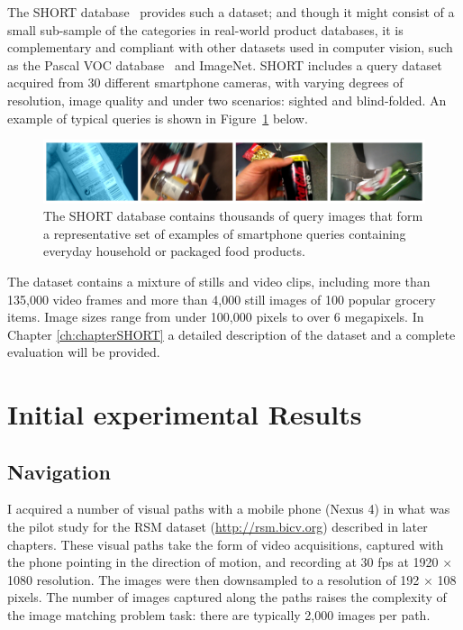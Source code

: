 The SHORT database~\cite{Rivera-Rubio2013a} provides such a dataset; and though it might consist of a small sub-sample of the categories in real-world product databases, it is  complementary and compliant with other datasets used in computer vision, such as the Pascal VOC database~\cite{Everingham2009} and ImageNet.  SHORT includes a query dataset acquired from 30 different smartphone cameras, with varying degrees of resolution, image quality and under two scenarios: sighted and blind-folded.  An example of typical queries is shown in Figure~\ref{fig:ShortQueries} below.

\begin{figure}
\centering
\includegraphics[width=\textwidth]{./gfx/Chapter02/TestDatasetCollage4imgs.jpg}
\caption{The SHORT database contains thousands of query images that form a representative set of examples of smartphone queries containing everyday household or packaged food products.}
\label{fig:ShortQueries}
\end{figure}

The dataset contains a mixture of stills and video clips, including more than 135,000 video frames and more than 4,000 still images of 100 popular grocery items.  Image sizes range from under 100,000 pixels to over 6 megapixels. In Chapter \ref{ch:chapterSHORT} a detailed description of the dataset and a complete evaluation will be provided.



\section{Initial experimental Results} \label{sec:expResults}

\subsection{Navigation}

I acquired a number of visual paths with a mobile phone (Nexus 4) in what was the pilot study for the RSM dataset (\url{http://rsm.bicv.org}) described in later chapters.  These visual paths take the form of video acquisitions, captured with the phone pointing in the direction of motion, and recording at 30 fps at 1920 $\times$ 1080 resolution. The images were then downsampled to a resolution of 192 $\times$ 108 pixels. The number of images captured along the paths raises the complexity of the image matching problem task: there are typically 2,000 images per path.


